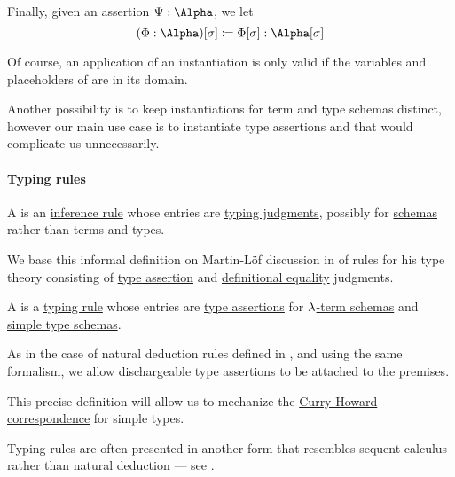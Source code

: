 \begin{definition}
\begin{thmenum}
     Finally, given an assertion \( \Psi: \Alpha \), we let
    \begin{equation}\label{eq:def:lambda_schema_instantiation/assertion}
      (\Phi: \Alpha)[\sigma] \coloneqq \Phi[\sigma]: \Alpha[\sigma]
    \end{equation}
  \end{thmenum}
\end{definition}
\begin{comments}
  \item Of course, an application of an instantiation is only valid if the variables and placeholders of are in its domain.

  \item Another possibility is to keep instantiations for term and type schemas distinct, however our main use case is to instantiate type assertions and that would complicate us unnecessarily.
\end{comments}

\paragraph{Typing rules}

\begin{concept}\label{con:typing_rule}
  A  is an \hyperref[def:inference_rule]{inference rule} whose entries are \hyperref[rem:type_judgments]{typing judgments}, possibly for \hyperref[con:schemas_and_instances]{schemas} rather than terms and types.
\end{concept}
\begin{comments}
  \item We base this informal definition on Martin-L\"of discussion in \cite{MartinLöf1984IntTypeTheory} of rules for his type theory consisting of \hyperref[def:type_assertion]{type assertion} and \hyperref[con:definitional_equality]{definitional equality} judgments.
\end{comments}

\begin{definition}\label{def:simple_typing_rule}\mimprovised
  A  is a \hyperref[con:typing_rule]{typing rule} whose entries are \hyperref[def:type_assertion]{type assertions} for \hyperref[def:lambda_term_schema]{\( \mathrm{\lambda} \)-term schemas} and \hyperref[def:simple_type_schema]{simple type schemas}.

  As in the case of natural deduction rules defined in , and using the same formalism, we allow dischargeable type assertions to be attached to the premises.
\end{definition}
\begin{comments}
  \item This precise definition will allow us to mechanize the \hyperref[con:curry_howard_correspondence]{Curry-Howard correspondence} for simple types.

  \item Typing rules are often presented in another form that resembles sequent calculus rather than natural deduction --- see .
\end{comments}

